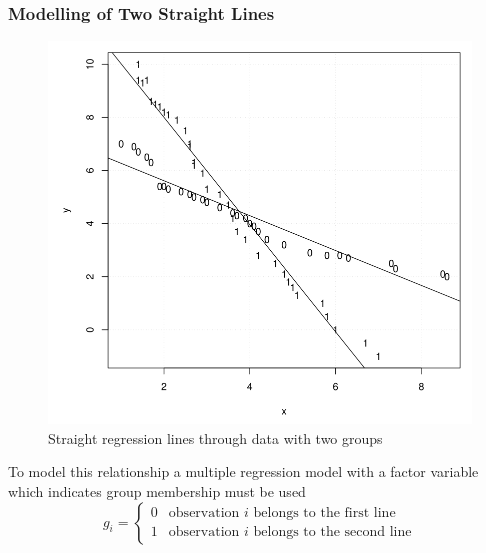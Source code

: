 \documentclass[11pt]{article}
\theoremstyle{definition}
\begin{document}
\subsubsection{Modelling of Two Straight Lines}
\begin{figure}[H]
	\centering
	\includegraphics[width=0.4\linewidth]{img/two_straigt_lines}
	\caption{Straight regression lines through data with two groups}
	\label{fig:twostraigtlines}
\end{figure}
To model this relationship a multiple regression model with a factor variable which indicates group membership must be used
\begin{equation*}
	g_i = \left\{
	\begin{matrix}
		0 & \text{observation $i$ belongs to the first line}\\
		1 & \text{observation $i$ belongs to the second line}
	\end{matrix}
	\right.
\end{equation*}
\end{document}
